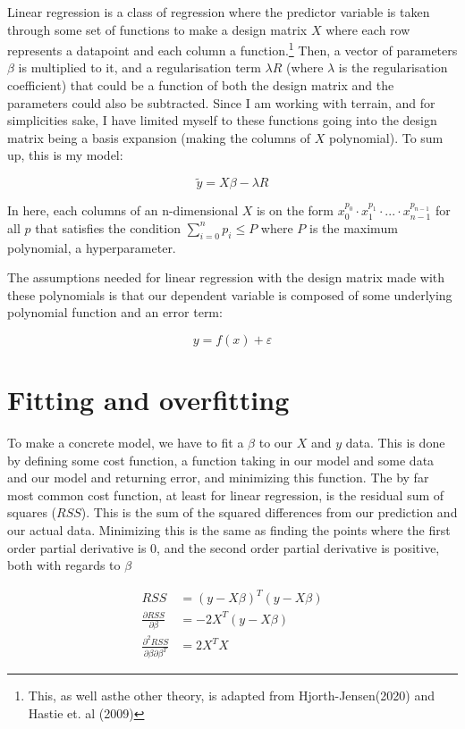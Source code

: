 \documentclass[11pt, a4paper]{report}
\begin{document}
Linear regression is a class of regression where the predictor variable is taken through some set of functions to make a design matrix $X$ where each row represents a datapoint and each column a function.\footnote[1]{This, as well asthe other theory, is adapted from Hjorth-Jensen(2020) and Hastie et. al (2009)} Then, a vector of parameters $\beta$ is multiplied to it, and a regularisation term $\lambda R$ (where $\lambda$ is the regularisation coefficient) that could be a function of both the design matrix and the parameters could also be subtracted. Since I am working with terrain, and for simplicities sake, I have limited myself to these functions going into the design matrix being a basis expansion (making the columns of $X$ polynomial). To sum up, this is my model:

\[ \tilde{y} = X \beta - \lambda R \]

In here, each columns of an n-dimensional $X$ is on the form $x_0^{p_0} \cdot x_1^{p_1} \cdot ... \cdot x_{n-1}^{p_{n-1}}$ for all $p$ that satisfies the condition $\sum_{i=0}^n p_i \leq P$ where $P$ is the maximum polynomial, a hyperparameter.

The assumptions needed for linear regression with the design matrix made with these polynomials is that our dependent variable is composed of some underlying polynomial function and an error term:

\[ y = f(x) + \varepsilon \]

\section{Fitting and overfitting}

To make a concrete model, we have to fit a $\beta$ to our $X$ and $y$ data. This is done by defining some cost function, a function taking in our model and some data and our model and returning error, and minimizing this function. The by far most common cost function, at least for linear regression, is the residual sum of squares ($RSS$). This is the sum of the squared differences from our prediction and our actual data. Minimizing this is the same as finding the points where the first order partial derivative is 0, and the second order partial derivative is positive, both with regards to $\beta$

\begin{align}
RSS &= (y - X \beta)^T (y - X \beta) \\
\frac{\partial RSS}{\partial{\beta}} &= -2 X^T (y - X \beta) \\
\frac{\partial^2 RSS}{\partial \beta \partial \beta^T} &= 2 X^T X
\end{align}
\end{document}
